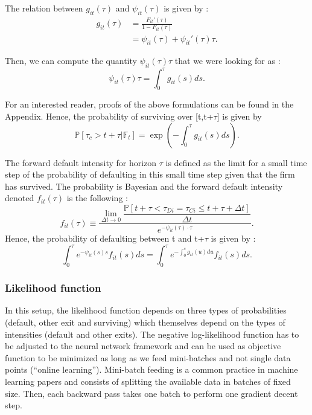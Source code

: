 \noindent The relation between $g_{it}(\tau)$ and $\psi_{it}(\tau)$  is given by :
\begin{align} \label{gphi}
    g_{it}(\tau) &= \frac{F_{it}'(\tau)}{1-F_{it}(\tau)} \nonumber \\
    &= \psi_{it}(\tau) + \psi_{it}'(\tau)\tau.
\end{align}

\noindent Then, we can compute the quantity $\psi_{it}(\tau) \tau$ that we were looking for as :
\begin{equation}
    \psi_{it}(\tau) \tau = \int_0^{\tau}g_{it}(s) ds.
\end{equation}

\noindent For an interested reader, proofs of the above formulations can be found in the Appendix. Hence, the probability of surviving over [t,t+$\tau$] is given by
\begin{equation} \label{survprob}
    \mathbb{P}[\tau_c > t+\tau |\mathbb{F}_t] = \exp(-\int_0^\tau g_{it}(s) ds).
\end{equation}

The forward default intensity for horizon $\tau$ is defined as the limit for a small time step of the probability of defaulting in this small time step given that the firm has survived. The probability is Bayesian and the forward default intensity denoted $f_{it}(\tau)$ is the following :
\begin{equation}
f_{it}(\tau) \equiv \dfrac{\lim_{\Delta t\to 0} \dfrac{\mathbb{P}[t + \tau < \tau_{Di}=\tau_{Ci} \leq t+ \tau + \Delta t]}{\Delta t}}{e^{-\psi_{it}(\tau)\cdot\tau}}.
\end{equation}
Hence, the probability of defaulting between t and t+$\tau$ is given by :
\begin{equation}\label{probdef}
\int_0^{\tau} e^{-\psi_{it}(s)s} f_{it}(s)ds = \int_0^{\tau} e^{-\int_0^s g_{it}(u) du} f_{it}(s)ds.
\end{equation}


\subsubsection{Likelihood function}
\label{SSS:2-1-2}

In this setup, the likelihood function depends on three types of probabilities (default, other exit and surviving) which themselves depend on the types of intensities (default and other exits). The negative log-likelihood function has to be adjusted to the neural network framework and can be used as objective function to be minimized as long as we feed mini-batches and not single data points (``online learning''). Mini-batch feeding is a common practice in machine learning papers and consists of splitting the available data in batches of fixed size. Then, each backward pass takes one batch to perform one gradient decent step.  \\

